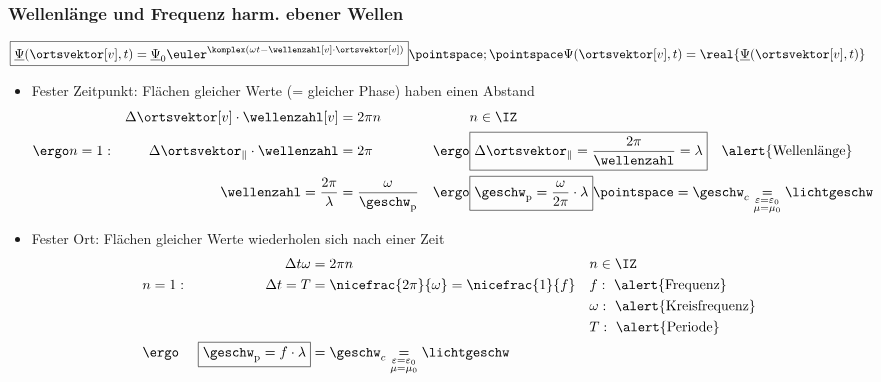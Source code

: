 \begin{frame}
  \frametitle{Wellenlänge und Frequenz harm. ebener Wellen}
    \begin{equation*}
      \boxed{\underline{\Psi}(\ortsvektor[v], t) = \underline{\Psi}_0 \euler^{\komplex(\omega t -\wellenzahl[v] \cdot \ortsvektor[v])} }\pointspace ; \pointspace \Psi(\ortsvektor[v], t) = \real{\underline{\Psi}(\ortsvektor[v], t)}
      \end{equation*}
  \begin{itemize}[<+->]
  \item \alert{Fester Zeitpunkt}: Flächen gleicher Werte (= gleicher Phase) haben einen Abstand
    \begin{align*}
&&\Delta\ortsvektor[v]\cdot\wellenzahl[v] &= 2\pi n &&n\in\IZ\\
\ergo &n = 1 : &\Delta\ortsvektor_\Vert \cdot \wellenzahl &= 2\pi &\ergo &\boxed{\Delta \ortsvektor_\Vert = \frac{2\pi}{\wellenzahl} =\lambda}\quad \text{\alert{Wellenlänge}}\\
&& \wellenzahl = \frac{2\pi}{\lambda}&= \frac{\omega}{\geschw_{\mathrm{p}}} &\ergo&\boxed{\geschw_{\mathrm{p}}=\frac{\omega}{2\pi}\cdot \lambda}\pointspace = \geschw_{c} \underset{\substack{\varepsilon = \varepsilon_0 \\ \mu = \mu_0}}{=} \lichtgeschw
\end{align*}
\item \alert{Fester Ort}: Flächen gleicher Werte wiederholen sich nach einer Zeit
\begin{align*}
&&\Delta t \omega &= 2\pi  n && n\in \IZ\\
& n=1: &\Delta t = T &= \nicefrac{2\pi}{\omega} = \nicefrac{1}{f}&&
f:\text{ \alert{Frequenz}}\\
&&&&&\omega:\text{ \alert{Kreisfrequenz}}\\
&&&&&T:\text{ \alert{Periode}}\\
&\ergo & \boxed{\geschw_{\mathrm{p}}= f \cdot \lambda}&= \geschw_{c}\underset{\substack{\varepsilon = \varepsilon_0 \\ \mu = \mu_0}}{=} \lichtgeschw
\end{align*}
  \end{itemize}
\end{frame}

